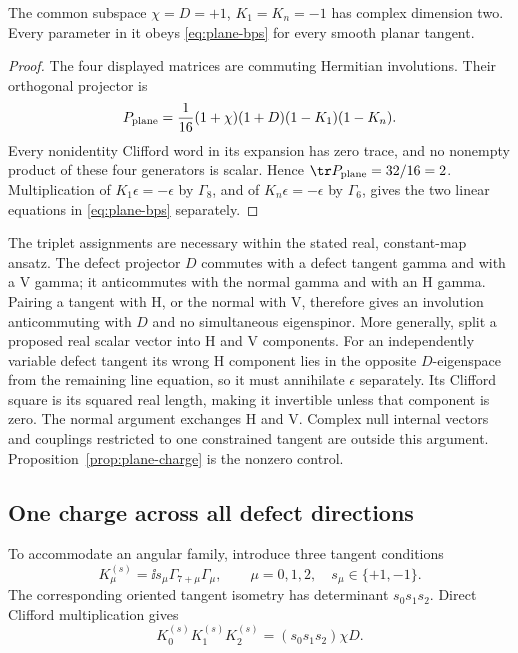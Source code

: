 \begin{proposition}\label{prop:plane-charge}
The common subspace
$\chi=D=+1$, $K_1=K_n=-1$ has complex dimension two. Every parameter
in it obeys \eqref{eq:plane-bps} for every smooth planar tangent.
\end{proposition}
\begin{proof}
The four displayed matrices are commuting Hermitian involutions. Their
orthogonal projector is
\begin{equation}
 P_{\rm plane}=\frac1{16}(1+\chi)(1+D)(1-K_1)(1-K_n).
\end{equation}
Every nonidentity Clifford word in its expansion has zero trace, and
no nonempty product of these four generators is scalar. Hence
$\tr P_{\rm plane}=32/16=2$. Multiplication of $K_1\epsilon=-\epsilon$
by $\Gamma_8$, and of $K_n\epsilon=-\epsilon$ by $\Gamma_6$, gives
the two linear equations in \eqref{eq:plane-bps} separately.
\end{proof}

The triplet assignments are necessary within the stated real,
constant-map ansatz. The defect projector $D$ commutes with a defect
tangent gamma and with a V gamma; it anticommutes with the normal
gamma and with an H gamma. Pairing a tangent with H, or the normal
with V, therefore gives an involution anticommuting with $D$ and
no simultaneous eigenspinor. More generally, split a proposed real
scalar vector into H and V components. For an independently variable
defect tangent its wrong H component lies in the opposite
$D$-eigenspace from the remaining line equation, so it must annihilate
$\epsilon$ separately. Its Clifford square is its squared real length,
making it invertible unless that component is zero. The normal
argument exchanges H and V. Complex null internal vectors and
couplings restricted to one constrained tangent are outside this
argument. Proposition~\ref{prop:plane-charge} is the nonzero control.

\subsection{One charge across all defect directions}

To accommodate an angular family, introduce three tangent conditions
\begin{equation}
 K_\mu^{(s)}=\ii s_\mu\Gamma_{7+\mu}\Gamma_\mu,
 \qquad\mu=0,1,2,\quad s_\mu\in\{+1,-1\}.
\end{equation}
The corresponding oriented tangent isometry has determinant
$s_0s_1s_2$. Direct Clifford multiplication gives
\begin{equation}\label{eq:orientation-identity}
 K_0^{(s)}K_1^{(s)}K_2^{(s)}=(s_0s_1s_2)\chi D.
\end{equation}

